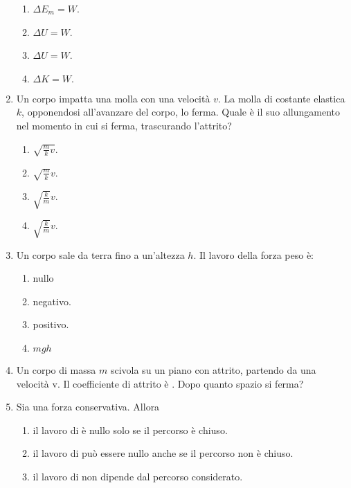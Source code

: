 \documentclass{article}
\begin{document}
\begin{enumerate}
  \begin{enumerate}[label=\Alph*.]
    \item $\Delta E_m=W$.
    \item $\Delta U=W$.
    \item $\Delta U=W$.
    \item $\Delta K=W.$
  \end{enumerate}
  \item Un corpo impatta una molla con una velocità $v$. La molla di costante elastica $k$, opponendosi all'avanzare del corpo, lo ferma. Quale è il suo allungamento nel momento in cui si ferma, trascurando l'attrito?
  \begin{enumerate}[label=\Alph*.]
    \item $\sqrt{\frac{m}{k}v}$.
    \item $\sqrt{\frac{m}{k}}v$.
    \item $\sqrt{\frac{k}{m}}v$.
    \item $\sqrt{\frac{k}{m}}v$.
  \end{enumerate}
  \item Un corpo sale da terra fino a un'altezza $h$. Il lavoro della forza peso è:
  \begin{enumerate}[label=\Alph*.]
    \item nullo
    \item negativo.
    \item positivo.
    \item $mgh$
  \end{enumerate}
  \item Un corpo di massa $m$ scivola su un piano con attrito, partendo da una velocità v. Il coefficiente di attrito è \mu. Dopo quanto spazio si ferma?
  \begin{enumerate}[label=\Alph*.]
    \item $\frac{v^2}{2g\mu}}$.
    \item $\frac{2v^2}{g\mu}}$.
    \item $\frac{1}{2}v^2-\mu g$.
    \item $\frac{1}{2}v^2+\mu g$.
  \end{enumerate}
  \item Sia  una forza conservativa. Allora
  \begin{enumerate}[label=\Alph*.]
    \item il lavoro di  è nullo solo se il percorso è chiuso.
    \item il lavoro di  può essere nullo anche se il percorso non è chiuso.
    \item il lavoro di  non dipende dal percorso considerato.

\end{enumerate}
\end{enumerate}
\end{document}
